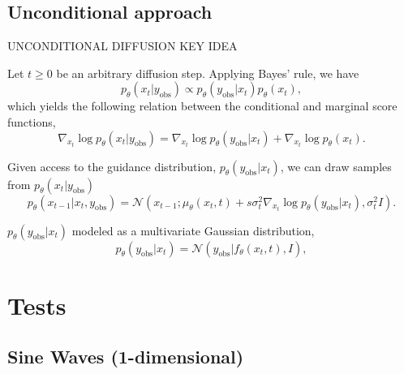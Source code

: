 \documentclass[8pt]{beamer}
\renewcommand{\|}{\ensuremath{\hspace{0.1cm} | \hspace{0.1cm}}}
\begin{document}
    \subsection{Unconditional approach}
    \begin{frame}
        
            UNCONDITIONAL DIFFUSION KEY IDEA
            
        Let $t \geq 0$ be an arbitrary diffusion step. 
        Applying Bayes' rule, we have
        \begin{equation}
            p_\theta (x_t|y_{\text{obs}}) \propto p_\theta (y_{\text{obs}}|x_t)p_\theta (x_t),
            \label{eq:8}
        \end{equation}
        which yields the following relation between the 
        conditional and marginal score functions,
        \begin{equation}
            \nabla_{x_t} \log p_\theta (x_t|y_{\text{obs}}) = \nabla_{x_t} \log p_\theta (y_{\text{obs}}|x_t) + \nabla_{x_t} \log p_\theta (x_t).
            \label{eq:9}
        \end{equation}

        Given access to the guidance distribution, 
        $p_\theta (y_{\text{obs}}|x_t)$, 
        we can draw samples from $p_\theta (x_t|y_{\text{obs}})$
        \begin{equation}
            p_\theta (x_{t-1}|x_t, y_{\text{obs}}) = \mathcal{N}\left(x_{t-1}; \mu_\theta (x_t, t) + s\sigma^2_t \nabla_{x_t} \log p_\theta (y_{\text{obs}}|x_t), \sigma^2_t I\right).
            \label{eq:10}
        \end{equation}

        $p_\theta (y_{\text{obs}}|x_t)$ modeled as a multivariate Gaussian distribution,
        \begin{equation}
            p_\theta (y_{\text{obs}}|x_t) = \mathcal{N}\left(y_{\text{obs}}|f_\theta (x_t, t), I\right),
        \end{equation}
    \end{frame}

    \section{Tests}
    \subsection{Sine Waves (1-dimensional)}
\end{document}
